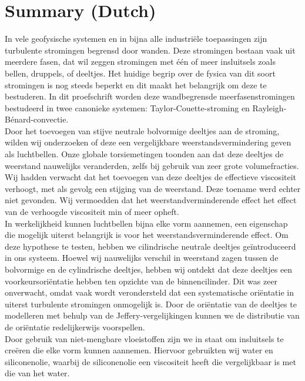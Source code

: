 \chapter{Summary (Dutch)}
In vele geofysische systemen en in bijna alle industri\"ele toepassingen
zijn turbulente stromingen begrensd door wanden.
Deze stromingen bestaan vaak uit meerdere fasen, dat wil zeggen stromingen met
\'e\'en of meer insluitsels zoals bellen, druppels, of deeltjes.
Het huidige begrip over de fysica van dit soort stromingen is nog steeds beperkt
en dit maakt het belangrijk om deze te bestuderen.
In dit proefschrift worden deze wandbegrensde meerfasenstromingen bestudeerd in
twee canonieke systemen: Taylor-Couette-stroming en
Rayleigh-B\'enard-convectie.\\
\indent Door het toevoegen van stijve neutrale bolvormige deeltjes aan de stroming,
wilden wij onderzoeken of deze een vergelijkbare weerstandsvermindering geven
als luchtbellen.
Onze globale torsiemetingen toonden aan dat deze deeltjes de weerstand
nauwelijks veranderden, zelfs bij gebruik van zeer grote volumefracties.
Wij hadden verwacht dat het toevoegen van deze deeltjes de effectieve
viscositeit verhoogt, met als gevolg een stijging van de weerstand.
Deze toename werd echter niet gevonden.
Wij vermoedden dat het weerstandverminderende effect het effect van de
verhoogde viscositeit min of meer opheft.\\
\indent In werkelijkheid kunnen luchtbellen bijna elke vorm aannemen, een eigenschap
die mogelijk uiterst belangrijk is voor het weerstandsverminderende effect.
Om deze hypothese te testen, hebben we cilindrische neutrale deeltjes
ge\"introduceerd in ons systeem.
Hoewel wij nauwelijks verschil in weerstand zagen tussen de bolvormige en
de cylindrische deeltjes, hebben wij ontdekt dat deze deeltjes een
voorkeursori\"entatie hebben ten opzichte van de binnencilinder.
Dit was zeer onverwacht, omdat vaak wordt verondersteld dat een systematische
ori\"entatie in uiterst turbulente stromingen onmogelijk is.
Door de ori\"entatie van de deeltjes te modelleren met behulp van de
Jeffery-vergelijkingen kunnen we de distributie van de ori\"entatie
redelijkerwijs voorspellen.\\
\indent Door gebruik van niet-mengbare vloeistoffen zijn we in staat om insluitsels te
cre\"eren die elke vorm kunnen aannemen.
Hiervoor gebruikten wij water en siliconenolie, waarbij de siliconenolie
een viscositeit heeft die vergelijkbaar is met die van het water.

